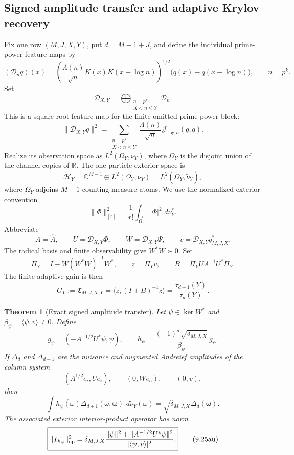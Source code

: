 \documentclass[11pt]{amsart}
\newtheorem{theorem}{Theorem}[section]
\theoremstyle{definition}
\theoremstyle{remark}
\newcommand{\dd}{\,d}
\begin{document}
\subsection{Signed amplitude transfer and adaptive Krylov recovery}
\label{sec:signed-krylov}

Fix one row \((M,J,X,Y)\), put \(d=M-1+J\), and define the individual
prime-power feature maps by
\[
 (\mathcal D_nq)(x)=
 \left(\frac{\Lambda(n)}{\sqrt n}K(x)K(x-\log n)\right)^{1/2}
 \bigl(q(x)-q(x-\log n)\bigr),
 \qquad n=p^k.
\]
Set
\[
 \mathcal D_{X,Y}=\bigoplus_{\substack{n=p^k\\X<n\le Y}}\mathcal D_n.
\]
This is a square-root feature map for the finite omitted prime-power
block:
\[
 \|\mathcal D_{X,Y}q\|^2
 =\sum_{\substack{n=p^k\\X<n\le Y}}
 \frac{\Lambda(n)}{\sqrt n}\mathcal J_{\log n}(q,q).
\tag{9.25ap}
\]
Realize its observation space as \(L^2(\Omega_Y,\nu_Y)\), where
\(\Omega_Y\) is the disjoint union of the channel copies of \(\mathbb R\).
The one-particle exterior space is
\[
 \mathcal H_Y=\mathbb C^{M-1}\oplus L^2(\Omega_Y,\nu_Y)
 =L^2(\widetilde\Omega_Y,\widetilde\nu_Y),
\]
where \(\widetilde\Omega_Y\) adjoins \(M-1\) counting-measure atoms.
We use the normalized exterior convention
\[
 \|\Phi\|_{[r]}^2=\frac1{r!}
 \int_{\widetilde\Omega_Y^r}|\Phi|^2\,\dd\widetilde\nu_Y^r.
\]
Abbreviate
\[
 A=\widehat A,\qquad
 U=\mathcal D_{X,Y}\Phi,\qquad
 W=\mathcal D_{X,Y}\Psi,\qquad
 v=\mathcal D_{X,Y}q_{M,J,X}^* .
\]
The radical basis and finite observability give \(W^*W\succ0\).  Set
\[
 \Pi_Y=I-W(W^*W)^{-1}W^*,\qquad
 z=\Pi_Yv,\qquad
 B=\Pi_YUA^{-1}U^*\Pi_Y .
\tag{9.25aq}
\]
The finite adaptive gain is then
\[
 \boxed{
 G_Y:=\mathfrak C_{M,J;X,Y}
 =\langle z,(I+B)^{-1}z\rangle
 =\frac{\tau_{d+1}(Y)}{\tau_d(Y)}.}
\tag{9.25ar}
\]

\begin{theorem}[Exact signed amplitude transfer]
\label{thm:signed-amplitude-transfer}
Let \(\psi\in\ker W^*\) and
\(\beta_\psi=\langle\psi,v\rangle\ne0\).  Define
\[
 g_\psi=(-A^{-1/2}U^*\psi,\psi),
 \qquad
 h_\psi=\frac{(-1)^d\sqrt{\delta_{M,J,X}}}
          {\overline{\beta_\psi}}\,g_\psi .
\tag{9.25as}
\]
If \(\Delta_d\) and \(\Delta_{d+1}\) are the nuisance and augmented
Andreief amplitudes of the column system
\[
 (A^{1/2}e_i,Ue_i),\qquad (0,We_a),\qquad (0,v),
\]
then
\[
 \boxed{
 \int\overline{h_\psi(\omega)}
 \Delta_{d+1}(\omega,\boldsymbol\omega)\,
 \dd\widetilde\nu_Y(\omega)
 =\sqrt{\delta_{M,J,X}}\Delta_d(\boldsymbol\omega).}
\tag{9.25at}
\]
The associated exterior interior-product operator has norm
\[
 \boxed{
 \|T_{h_\psi}\|_{\rm op}^2
 =\delta_{M,J,X}
 \frac{\|\psi\|^2+\|A^{-1/2}U^*\psi\|^2}
  {|\langle\psi,v\rangle|^2}.}
\tag{9.25au}
\]
\end{theorem}
\end{document}
